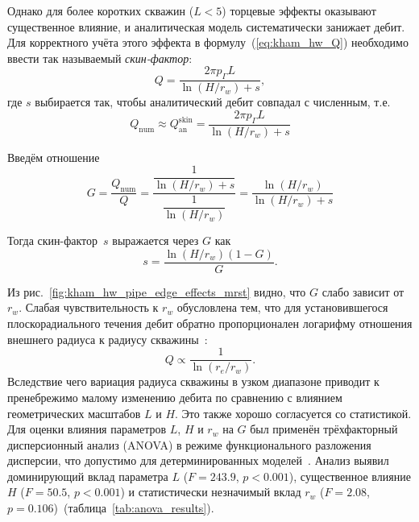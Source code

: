 \documentclass{article}
\begin{document}
Однако для более коротких скважин ($L < 5$) торцевые эффекты оказывают существенное влияние,
и аналитическая модель систематически занижает дебит. Для корректного учёта этого эффекта
в формулу~(\ref{eq:kham_hw_Q}) необходимо ввести так называемый \textit{скин-фактор}:
\begin{equation}
	\displaystyle
	Q = \dfrac{2 \pi p_{\Gamma} L}{\ln \left( H / r_w \right) + s},
	\label{eq:kham_hw_Q_skin}
\end{equation}
где $s$ выбирается так, чтобы аналитический дебит совпадал с численным,
т.е.
\begin{equation*}
	\displaystyle
	Q_{\text{num}} \approx Q_{\text{an}}^{\text{skin}} = \dfrac{2 \pi p_{\Gamma} L}{\ln \left( H / r_w \right) + s}
\end{equation*}

Введём отношение
\begin{equation}
	\displaystyle
	G = \dfrac{Q_{\text{num}}}{Q} = \dfrac{\dfrac{1}{\ln \left( H / r_w \right) + s}}{\dfrac{1}{\ln \left( H / r_w \right)}}  =
	\dfrac{\ln  \left( H / r_w \right)}{\ln  \left( H / r_w \right) + s}
	\label{eq:kham_hw_skin_G}
\end{equation}

Тогда скин-фактор~$s$ выражается через $G$ как
\begin{equation}
	\displaystyle
	s = \dfrac{\ln  \left( H / r_w \right) \left(1-G \right)}{G}.
	\label{eq:kham_hw_skin}
\end{equation}

Из рис.~\ref{fig:kham_hw_pipe_edge_effects_mrst} видно, что $G$ слабо зависит от $r_w$.
Слабая чувствительность к \(r_w\) обусловлена тем, что для установившегося плоскорадиального течения
дебит обратно пропорционален логарифму отношения внешнего радиуса к радиусу скважины~\cite{barenblatt1984}:
\begin{equation*}
	Q \propto \frac{1}{\ln(r_e / r_w)}.
\end{equation*}
Вследствие чего вариация радиуса скважины в узком диапазоне приводит к пренебрежимо малому
изменению дебита по сравнению с влиянием геометрических масштабов \(L\) и \(H\).
Это также хорошо согласуется со статистикой. Для оценки влияния параметров \(L\), \(H\) и \(r_w\) на \(G\) был применён
трёхфакторный дисперсионный анализ (ANOVA) в режиме функционального разложения дисперсии, что
допустимо для детерминированных моделей~\cite{saltelli2008global}. Анализ выявил доминирующий
вклад параметра \(L\) (\(F = 243.9\), \(p < 0.001\)), существенное влияние \(H\) (\(F = 50.5\), \(p < 0.001\))
и статистически незначимый вклад \(r_w\) (\(F = 2.08\), \(p = 0.106\))~(таблица~\ref{tab:anova_results}).
\end{document}
